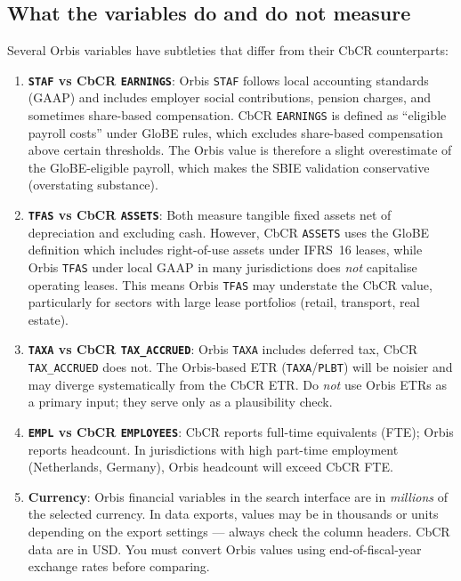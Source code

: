 \documentclass[11pt,a4paper]{article}
\newcommand{\field}[1]{\texttt{#1}}
\begin{document}
\subsection{What the variables do and do not measure}\label{sec:var_caveats}

Several Orbis variables have subtleties that differ from their CbCR counterparts:

\begin{enumerate}[noitemsep]
  \item \textbf{\field{STAF} vs CbCR \field{EARNINGS}}: Orbis \field{STAF} follows local accounting standards (GAAP) and includes employer social contributions, pension charges, and sometimes share-based compensation. CbCR \field{EARNINGS} is defined as ``eligible payroll costs'' under GloBE rules, which excludes share-based compensation above certain thresholds. The Orbis value is therefore a slight overestimate of the GloBE-eligible payroll, which makes the SBIE validation conservative (overstating substance).

  \item \textbf{\field{TFAS} vs CbCR \field{ASSETS}}: Both measure tangible fixed assets net of depreciation and excluding cash. However, CbCR \field{ASSETS} uses the GloBE definition which includes right-of-use assets under IFRS~16 leases, while Orbis \field{TFAS} under local GAAP in many jurisdictions does \emph{not} capitalise operating leases. This means Orbis \field{TFAS} may understate the CbCR value, particularly for sectors with large lease portfolios (retail, transport, real estate).

  \item \textbf{\field{TAXA} vs CbCR \field{TAX\_ACCRUED}}: Orbis \field{TAXA} includes deferred tax, CbCR \field{TAX\_ACCRUED} does not. The Orbis-based ETR (\field{TAXA}/\field{PLBT}) will be noisier and may diverge systematically from the CbCR ETR. Do \emph{not} use Orbis ETRs as a primary input; they serve only as a plausibility check.

  \item \textbf{\field{EMPL} vs CbCR \field{EMPLOYEES}}: CbCR reports full-time equivalents (FTE); Orbis reports headcount. In jurisdictions with high part-time employment (Netherlands, Germany), Orbis headcount will exceed CbCR FTE.

  \item \textbf{Currency}: Orbis financial variables in the search interface are in \emph{millions} of the selected currency. In data exports, values may be in thousands or units depending on the export settings --- always check the column headers. CbCR data are in USD. You must convert Orbis values using end-of-fiscal-year exchange rates before comparing.
\end{enumerate}
\end{document}
